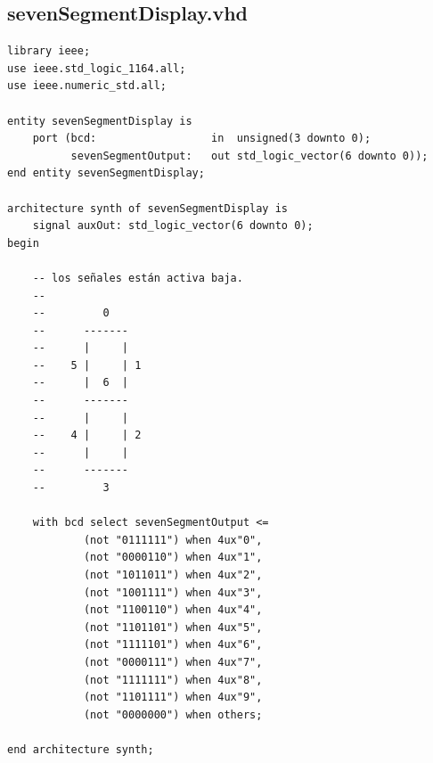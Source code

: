 \documentclass[a4paper]{article}
\begin{document}
\subsection{sevenSegmentDisplay.vhd}
\begin{verbatim}
library ieee;
use ieee.std_logic_1164.all;
use ieee.numeric_std.all;

entity sevenSegmentDisplay is
    port (bcd:                  in  unsigned(3 downto 0);
          sevenSegmentOutput:   out std_logic_vector(6 downto 0));
end entity sevenSegmentDisplay;

architecture synth of sevenSegmentDisplay is
    signal auxOut: std_logic_vector(6 downto 0);
begin

    -- los señales están activa baja.
    --
    --         0
    --      -------
    --      |     |
    --    5 |     | 1
    --      |  6  |
    --      -------
    --      |     |
    --    4 |     | 2
    --      |     |
    --      -------
    --         3

    with bcd select sevenSegmentOutput <=
            (not "0111111") when 4ux"0",
            (not "0000110") when 4ux"1",
            (not "1011011") when 4ux"2",
            (not "1001111") when 4ux"3",
            (not "1100110") when 4ux"4",
            (not "1101101") when 4ux"5",
            (not "1111101") when 4ux"6",
            (not "0000111") when 4ux"7",
            (not "1111111") when 4ux"8",
            (not "1101111") when 4ux"9",
            (not "0000000") when others;

end architecture synth;
\end{verbatim}
\end{document}
